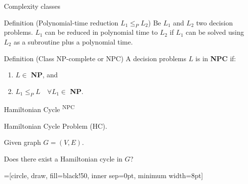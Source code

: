 \documentclass{beamer}
\begin{document}
\begin{frame}{Complexity classes}
	\begin{block}{Definition (Polynomial-time reduction $L_1 \leq_P L_2$)}
		Be $L_1$ and $L_2$ two decision problems. $L_1$ can be reduced in polynomial time to $L_2$ if $L_1$ can be solved using $L_2$ as a subroutine plus a polynomial time.
	\end{block}
	
	\begin{block}{Definition (Class NP-complete or NPC)}
		A decision problems $L$ is in \textbf{NPC} if:
		\begin{enumerate}
			\item $L \in $ \textbf{NP}, and
			\item $L_1 \leq_P L \quad \forall L_1 \in $ \textbf{NP}.
		\end{enumerate}
	\end{block}
\end{frame}



\begin{frame}{Hamiltonian Cycle \textsuperscript{NPC}}
\begin{description}[Parameters]
	\item[Name] Hamiltonian Cycle Problem (HC).
	\item[Parameters] Given graph $G=(V,E)$.
	\item[Question] Does there exist a Hamiltonian cycle in $G$?
\end{description}

\begin{center}
	=[circle, draw, fill=black!50, inner sep=0pt, minimum width=8pt]
\end{center}

\end{frame}
\end{document}
